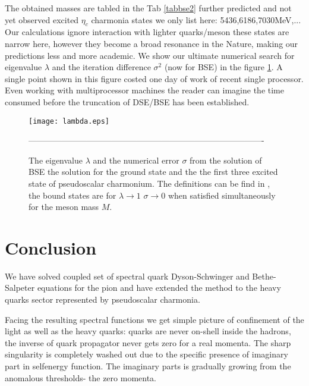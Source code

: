 \documentclass[aps,prd,superscriptaddress,eqsecnum,amsfonts,showpacs,epsfig]{revtex4}
\begin{document}
The obtained masses are tabled in the Tab \ref{tabbse2} further predicted and  not yet observed excited $\eta_{c}$ charmonia states  we only list here: 5436,6186,7030MeV,...
Our calculations  ignore interaction with lighter quarks/meson  these states are narrow here, however they become a broad resonance 
in the Nature, making our predictions less and more academic.    We  show our ultimate  numerical search for  eigenvalue $\lambda$  and the iteration difference $\sigma^2$ (now for BSE)  in the  figure \ref{tri}.  A single point shown in this figure costed one day of work of recent  single processor. Even working with multiprocessor machines the   reader can imagine the time consumed before the truncation of DSE/BSE has been established.  
%
\begin{figure}
\centerline{\texttt{[image: lambda.eps]}}
\caption{The eigenvalue $\lambda$ and the numerical error $\sigma$ from the solution of BSE the  solution for the ground state and the the first three excited state of pseudoscalar  charmonium. The definitions can be find in \cite{saulipsy}, the bound states are for $\lambda \rightarrow 1$  $\sigma\rightarrow 0$ when satisfied simultaneously for the meson mass $M$. }
\label{tri}
{\mbox{-------------------------------------------------------------------------------------}}
\end{figure}
 

\section{Conclusion}

We  have solved coupled set of spectral quark Dyson-Schwinger  and Bethe-Salpeter equations for the pion and  have extended the method to the heavy quarks sector represented by  pseudoscalar charmonia. 

Facing the resulting spectral functions   we get   
simple picture of confinement of the light as well as the heavy quarks:  quarks are never on-shell inside the hadrons,  the inverse of quark propagator never gets zero for a real momenta. The sharp  singularity is completely washed out due to the specific presence of imaginary part in selfenergy function.  The imaginary parts is  gradually growing from the anomalous thresholds- the zero momenta. 
\end{document}
